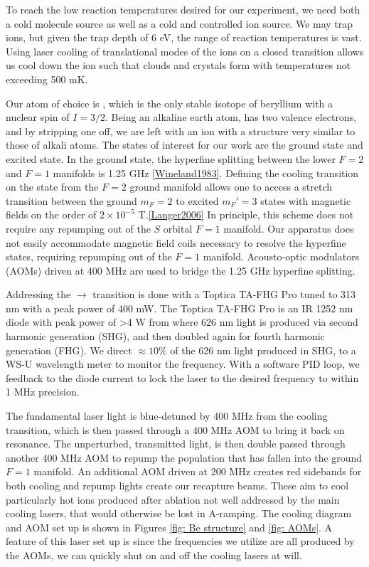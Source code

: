 To reach the low reaction temperatures desired for our experiment, we need both a cold molecule source as well as a cold and controlled ion source. We may trap  ions, but given the trap depth of 6 eV, the range of reaction temperatures is vast. Using laser cooling of translational modes of the ions on a closed transition allows us cool down the ion such that clouds and crystals form with temperatures not exceeding 500 mK.\cite{Wineland1979}

Our atom of choice is , which is the only stable isotope of beryllium with a nuclear spin of $I=3/2$. Being an alkaline earth atom,  has two valence electrons, and by stripping one off, we are left with an ion with a structure very similar to those of alkali atoms. The states of interest for our work are the  ground state and  excited state. In the ground state, the hyperfine splitting between the lower $F=2$ and $F=1$ manifolds is 1.25 GHz \ref{Wineland1983}. Defining the cooling transition on the  state from the $F=2$ ground manifold allows one to access a stretch transition between the ground $m_F=2$ to excited $m_F'=3$ states with magnetic fields on the order of $2 \times 10^{-5}$ T.\ref{Langer2006} In principle, this scheme does not require any repumping out of the $S$ orbital $F=1$ manifold. Our apparatus does not easily accommodate magnetic field coils necessary to resolve the hyperfine states, requiring repumping out of the $F=1$ manifold. Acousto-optic modulators (AOMs) driven at 400 MHz are used to bridge the 1.25 GHz hyperfine splitting.

Addressing the $\rightarrow$ transition is done with a Toptica TA-FHG Pro tuned to 313 nm with a peak power of 400 mW. The Toptica TA-FHG Pro is an IR 1252 nm diode with peak power of >4 W from where 626 nm light is produced via second harmonic generation (SHG), and then doubled again for fourth harmonic generation (FHG). We direct $\approx 10\%$ of the 626 nm light produced in SHG, to a WS-U wavelength meter to monitor the frequency. With a software PID loop, we feedback to the diode current to lock the laser to the desired frequency to within 1 MHz precision.

The fundamental laser light is blue-detuned by 400 MHz from the cooling transition, which is then passed through a 400 MHz AOM to bring it back on resonance. The unperturbed, transmitted light, is then double passed through another 400 MHz AOM to repump the population that has fallen into the ground $F=1$ manifold. An additional AOM driven at 200 MHz creates red sidebands for both cooling and repump lights create our recapture beams. These aim to cool particularly hot  ions produced after ablation not well addressed by the main cooling lasers, that would otherwise be lost in A-ramping. The  cooling diagram and AOM set up is shown in Figures \ref{fig: Be structure} and \ref{fig: AOMs}. A feature of this laser set up is since the frequencies we utilize are all produced by the AOMs, we can quickly shut on and off the cooling lasers at will.

